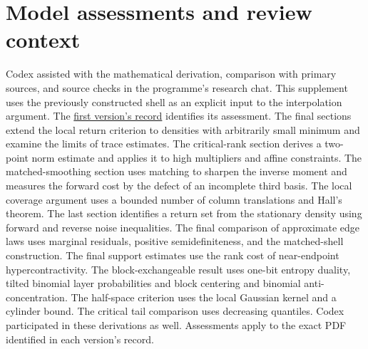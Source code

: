 \documentclass[11pt]{article}
\begin{document}



















\section*{Model assessments and review context}
Codex assisted with the mathematical derivation, comparison with primary
sources, and source checks in the programme's research chat. This supplement
uses the previously constructed shell as an explicit input to the interpolation
argument. The \href{https://airr.science/papers/ARR-2026-2SH3CGGBHG9Q5BYN/versions/v1/}{first version's record} identifies its assessment. The final sections extend the local return criterion to densities with arbitrarily small minimum and examine the limits of trace estimates. The critical-rank section derives a two-point norm estimate and applies it to high multipliers and affine constraints. The matched-smoothing section uses matching to sharpen the inverse moment and measures the forward cost by the defect of an incomplete third basis. The local coverage argument uses a bounded number of column translations and Hall's theorem. The last section identifies a return set from the stationary density using forward and reverse noise inequalities. The final comparison of approximate edge laws uses marginal residuals, positive semidefiniteness, and the matched-shell construction. The final support estimates use the rank cost of near-endpoint hypercontractivity. The block-exchangeable result uses one-bit entropy duality, tilted binomial layer probabilities and block centering and binomial anti-concentration. The half-space criterion uses the local Gaussian kernel and a cylinder bound. The critical tail comparison uses decreasing quantiles. Codex participated in these derivations as well. Assessments apply to the exact PDF identified in each version's record.
\end{document}
